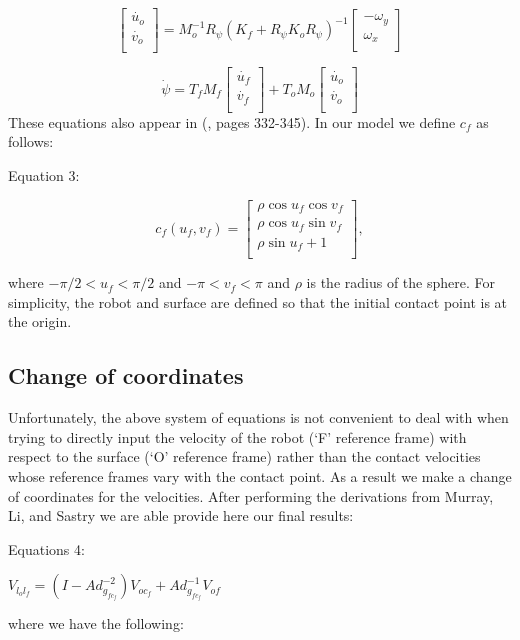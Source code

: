 \documentclass[journal]{IEEEtran}
\begin{document}
\[
\left[
\begin{array}{c}
\dot{u_o}\\
\dot{v_o}\\
\end{array}
\right]
= M_o^{-1}R_{\psi}(K_f + R_{\psi} K_o R_{\psi})^{-1}
\left[
\begin{array}{c}
-\omega_y\\
\omega_x\\
\end{array}
\right]
\]


\[
\dot{\psi} =  T_f M_f 
\left[
\begin{array}{c}
\dot{u_f}\\
\dot{v_f}\\
\end{array}
\right]
+ T_o M_o
\left[
\begin{array}{c}
\dot{u_o}\\
\dot{v_o}\\
\end{array}
\right] \]
These equations also appear in (\cite{book}, pages 332-345).  In our model we define $c_f$ as follows:
\begin{center}
Equation 3:
\end{center}


\[ c_f(u_f,v_f)=
\left[
\begin{array}{c}
\rho \cos{u_f} \cos{v_f}\\
\rho \cos{u_f} \sin{v_f}\\
\rho \sin{u_f} +1\\
\end{array}
\right],\]

where $- \pi/2 < u_f < \pi/2$ and $- \pi < v_f < \pi$ and $\rho$ is the radius of the sphere. For simplicity, the robot and surface are defined so that the initial contact point is at the origin.


\subsection{Change of coordinates}
Unfortunately, the above system of equations is not convenient to deal with when trying to directly input the velocity of the robot (`F' reference frame) with respect to the surface (`O' reference frame) rather than the contact velocities whose reference frames vary with the contact point. As a result we make a change of coordinates for the velocities. After performing the derivations from Murray, Li, and Sastry \cite{book} we are able provide here our final results:
\begin{center}
Equations 4:
\end{center}
\begin{center}
	$V_{l_ol_f} = (I-Ad^{-2}_{g_{fc_f}}) V_{oc_f} + Ad^{-1}_{g_{fc_f}}V_{of}$ \\
\end{center}
where we have the following:
\end{document}
